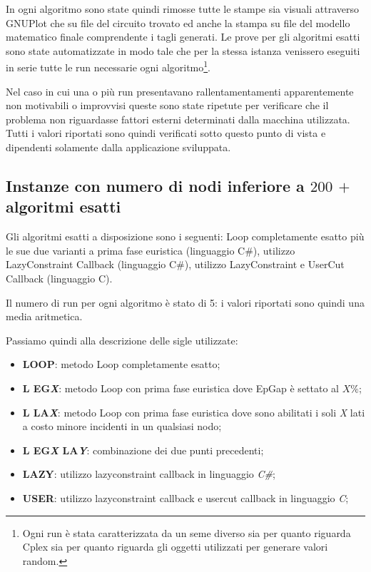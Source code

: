 \documentclass[11pt]{article}
\begin{document}
In ogni algoritmo sono state quindi rimosse tutte le stampe sia visuali attraverso GNUPlot che su file del circuito trovato ed anche la stampa su file del modello matematico finale comprendente i tagli generati. Le prove per gli algoritmi esatti sono state automatizzate in modo tale che per la stessa istanza venissero eseguiti in serie tutte le run necessarie ogni algoritmo\footnote{Ogni run è stata caratterizzata da un seme diverso sia per quanto riguarda Cplex sia per quanto riguarda gli oggetti utilizzati per generare valori random.}.

Nel caso in cui una o più run presentavano rallentamentamenti apparentemente non motivabili o improvvisi queste sono state ripetute per verificare che il problema non riguardasse fattori esterni determinati dalla macchina utilizzata. Tutti i valori riportati sono quindi verificati sotto questo punto di vista e dipendenti solamente dalla applicazione sviluppata.

\subsection*{Instanze con numero di nodi inferiore a \textbf{$200$} $+$ algoritmi esatti}

Gli algoritmi esatti a disposizione sono i seguenti: Loop completamente esatto più le sue due varianti a prima fase euristica (linguaggio C\#), utilizzo LazyConstraint Callback (linguaggio C\#), utilizzo LazyConstraint e UserCut Callback (linguaggio C).

Il numero di run per ogni algoritmo è stato di 5: i valori riportati sono quindi una media aritmetica.

Passiamo quindi alla descrizione delle sigle utilizzate:
\begin{itemize}
    \item \textbf{LOOP}: metodo Loop completamente esatto;
    \item \textbf{L EG\textit{X}}: metodo Loop con prima fase euristica dove EpGap è settato al $X\%$;
    \item \textbf{L LA\textit{X}}: metodo Loop con prima fase euristica dove sono abilitati i soli \textit{X} lati a costo minore incidenti in un qualsiasi nodo;
    \item \textbf{L EG\textit{X} LA\textit{Y}}: combinazione dei due punti precedenti;
    \item \textbf{LAZY}: utilizzo lazyconstraint callback in linguaggio\textit{ C\#};
    \item \textbf{USER}: utilizzo lazyconstraint callback e usercut callback in linguaggio \textit{C};
\end{itemize}
\end{document}

